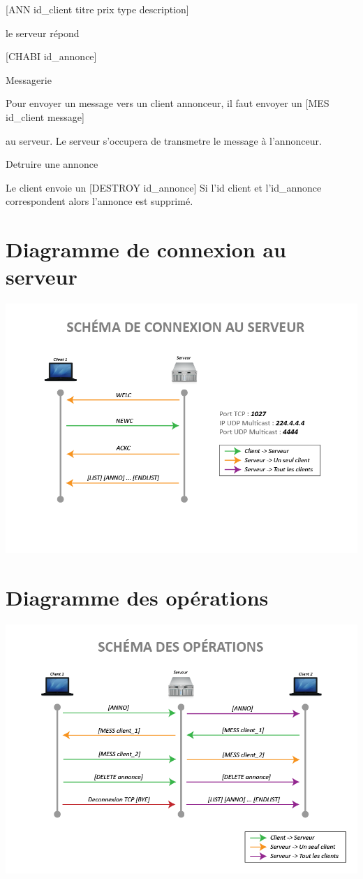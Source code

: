 \documentclass[12pt]{article}
\begin{document}
[ANN id\_client titre prix type description]

le serveur répond

[CHABI id\_annonce]


Messagerie

Pour envoyer un message vers un client annonceur, il faut envoyer un
[MES id\_client message]

 au serveur. Le serveur s'occupera de transmetre le message à l'annonceur.

Detruire une annonce

Le client envoie un [DESTROY id\_annonce]
Si l'id client et l'id\_annonce correspondent alors l'annonce est supprimé.






\section{Diagramme de connexion au serveur}

\includegraphics[width=\textwidth]{rendu1/Protocole_Connection.png}

\section{Diagramme des opérations}

\includegraphics[width=\textwidth]{rendu1/Protocole_Operations.png}
\end{document}
